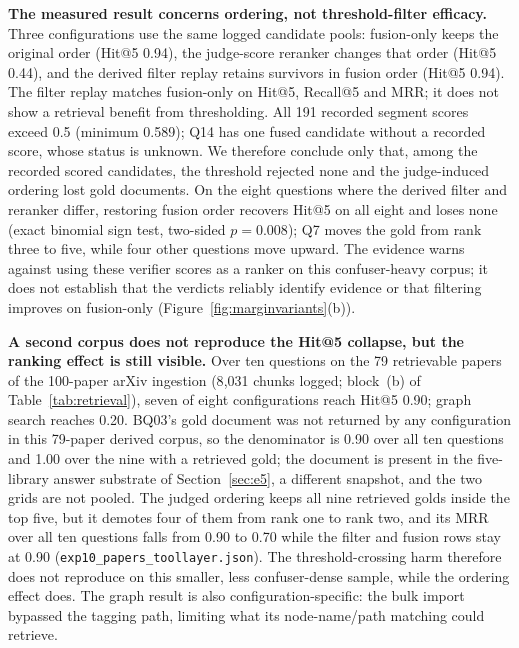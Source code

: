 \textbf{The measured result concerns ordering, not threshold-filter efficacy.}
Three configurations use the same logged candidate pools: fusion-only keeps
the original order (Hit@5 0.94), the judge-score reranker changes that order
(Hit@5 0.44), and the derived filter replay retains survivors in fusion order
(Hit@5 0.94). The filter replay matches fusion-only on Hit@5, Recall@5 and MRR;
it does not show a retrieval benefit from thresholding. All 191 recorded
segment scores exceed 0.5 (minimum 0.589); Q14 has one fused candidate without
a recorded score, whose status is unknown. We therefore conclude only that,
among the recorded scored candidates, the threshold rejected none and the
judge-induced ordering lost gold documents. On the eight questions where the
derived filter and reranker differ, restoring fusion order recovers Hit@5 on
all eight and loses none (exact binomial sign test, two-sided $p=0.008$); Q7
moves the gold from rank three to five, while four other questions move
upward. The evidence warns against using these verifier scores as a ranker on
this confuser-heavy corpus; it does not establish that the verdicts reliably
identify evidence or that filtering improves on fusion-only
(Figure~\ref{fig:marginvariants}(b)).

\textbf{A second corpus does not reproduce the Hit@5 collapse, but the ranking
effect is still visible.} Over ten
questions on the 79 retrievable papers of the 100-paper arXiv ingestion
(8{,}031 chunks logged; block~(b) of Table~\ref{tab:retrieval}), seven of
eight configurations reach Hit@5 0.90; graph search reaches 0.20. BQ03's
gold document was not returned by any configuration in this 79-paper derived
corpus, so the denominator is 0.90 over all ten questions and 1.00 over the
nine with a retrieved gold; the document is present in the five-library answer
substrate of Section~\ref{sec:e5}, a different snapshot, and the two grids are
not pooled. The judged ordering keeps all nine retrieved golds inside the top
five, but it demotes four of them from rank one to rank two, and its MRR over
all ten questions falls from 0.90 to 0.70 while the filter and fusion rows stay
at 0.90 (\texttt{exp10\_papers\_toollayer.json}). The
threshold-crossing harm therefore does not reproduce on this smaller,
less confuser-dense sample, while the ordering effect does. The graph result
is also configuration-specific: the bulk import bypassed the tagging path,
limiting what its node-name/path matching could retrieve.

